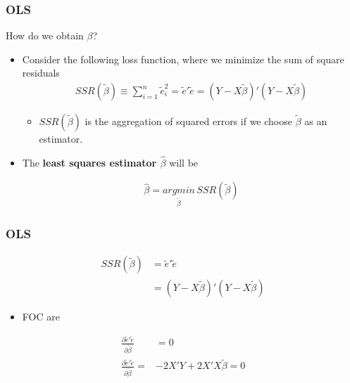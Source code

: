 \documentclass[
  shownotes,
  xcolor={svgnames},
  hyperref={colorlinks,citecolor=DarkBlue,linkcolor=DarkRed,urlcolor=DarkBlue}
  , aspectratio=169]{beamer}
\begin{document}
\begin{frame}
\frametitle{OLS}
How do we obtain $\beta$?

\begin{itemize}
  \item Consider the following loss function, where we minimize the sum of square residuals
\begin{align}
  SSR(\tilde \beta) \equiv \sum_{i=1}^n \tilde e_i^2 = \tilde e' \tilde e  = (Y-X \tilde \beta)'(Y-X \tilde \beta)
\end{align}
  \begin{itemize}
    \footnotesize
  \item $SSR(\tilde \beta)$ is the aggregation of squared errors if we choose $\tilde \beta$ as an estimator.
  \end{itemize}  

  \bigskip

    \item The {\bf least squares estimator $\hat \beta$} will be

    \begin{align}
      \hat \beta = \underset{\tilde \beta}{argmin}\, SSR(\tilde \beta)
    \end{align}

\end{itemize}

\end{frame}


\begin{frame}
\frametitle{OLS}

\begin{align}
  SSR(\tilde \beta) &= \tilde e' \tilde e  \\
  &= (Y-X \tilde \beta)'(Y-X \tilde \beta)
\end{align}

\begin{itemize}
  \item FOC are
\end{itemize}


\begin{align}
 \frac{\partial \tilde{e}' \tilde{e}}{\partial \tilde \beta} &=0   \\
 \frac{\partial \tilde{e}' \tilde{e}}{\partial \tilde \beta}  =&-2X'Y + 2X'X \tilde\beta =0
\end{align}

\end{frame}
\end{document}
